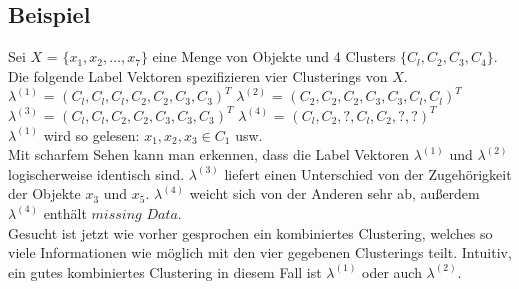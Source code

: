 \documentclass[runningheads]{llncs}
\begin{document}
\subsection{Beispiel}
Sei $X$ = $\{x_1, x_2, \ldots, x_7\}$ eine Menge von Objekte und 4 Clusters $\{C_{l}, C_{2}, C_{3}, C_{4}\}$. Die folgende Label Vektoren spezifizieren  vier Clusterings von $X$.\\[4pt]
$\lambda^{(1)}$ = $(C_{l}, C_{l}, C_{l}, C_{2}, C_{2}, C_{3}, C_{3})^{T}$ \qquad		
$\lambda^{(2)}$ = $(C_{2}, C_{2}, C_{2}, C_{3}, C_{3}, C_{l}, C_{l})^{T}$ \\
$\lambda^{(3)}$ = $(C_{l}, C_{l}, C_{2}, C_{2}, C_{3}, C_{3}, C_{3})^{T}$	\qquad
$\lambda^{(4)}$ = $(C_{l}, C_{2}, ?, C_{l}, C_{2}, ?, ?)^{T}$ \\[4pt]
$\lambda^{(1)}$ wird so gelesen: $x_1, x_2, x_3 \in C_{1}$ usw.\\
Mit scharfem Sehen kann man erkennen, dass die Label Vektoren $\lambda^{(1)}$ und $\lambda^{(2)}$ logischerweise identisch sind. $\lambda^{(3)}$ liefert einen Unterschied von der Zugehörigkeit der Objekte $x_3$ und $x_5$. $\lambda^{(4)}$ weicht sich von der Anderen sehr ab, außerdem $\lambda^{(4)}$ enthält $missing$ $Data$.\\
Gesucht ist jetzt wie vorher gesprochen ein kombiniertes Clustering, welches so viele Informationen wie möglich mit den vier gegebenen Clusterings teilt. Intuitiv, ein gutes kombiniertes Clustering in diesem Fall ist  $\lambda^{(1)}$ oder auch $\lambda^{(2)}$.
\end{document}
